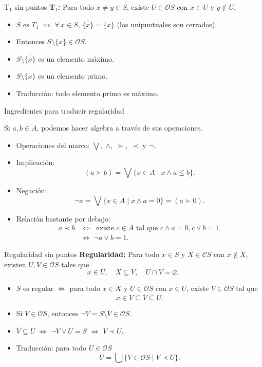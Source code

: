 \documentclass[compress,12pt]{beamer}
\begin{document}
\begin{frame}{T$_1$ sin puntos}
\textbf{T$_1$:} Para todo $x\neq y\in S$, existe $U\in \mathcal{O}S$ con $x\in U$ y $y\notin U$.

\vspace{0.5em}
\begin{itemize}
  \item<2-> $S$ es $T_1$ $\iff$ $\forall\,x\in S$, $\overline{\{x\}}=\{x\}$ (los unipuntuales son cerrados).
  \item<3-> Entonces $S\setminus\{x\}\in \mathcal{O}S$.
  \item<4-> $S\setminus\overline{\{x\}}$ es un elemento máximo.
  \item<5-> $S\setminus\{x\}$ es un elemento primo. 
  \item<6-> \alert{Traducción:} todo elemento primo es máximo.
\end{itemize}
\end{frame}

\begin{frame}{Ingredientes para traducir regularidad}

  Si $a,b\in A$, podemos hacer algebra a través de sus operaciones.
  \begin{itemize}
    \item<2-> Operaciones del marco: $\bigvee,\;\wedge,\;\succ,\;\prec$\; y \;$\neg$.
    \item<3-> Implicación:
      \[
        (a \succ b)=\bigvee\{x\in A\mid x\wedge a\leq b\}.
      \]
    \item<4-> Negación:
      \[
        \neg a=\bigvee\{x\in A\mid x\wedge a=0\}=(a \succ 0).
      \]
    \item<5-> Relación bastante por debajo: 
      \[
      \begin{split}
        a \prec b &\iff\;\mbox{ existe } c\in A \mbox{ tal que } c\wedge a=0, c\vee b=1.\\
        &\iff\; \neg a \vee b=1.
      \end{split}
      \]
  \end{itemize}

\end{frame}


\begin{frame}{Regularidad sin puntos}
\textbf{Regularidad:} Para todo $x\in S$ y $X\in \mathcal{C}S$ con $x\notin X$, existen $U,V\in \mathcal{O}S$ tales que 
\[
x\in U, \quad X\subseteq V, \quad U\cap V=\varnothing.
\]
\begin{itemize}
  \item<2-> $S$ es regular $\iff$ para todo $x\in X$ y $U\in \mathcal{O}S$ con  $x\in U$, existe $V\in\mathcal{O}S$ tal que
    \[
      x\in V\subseteq \overline{V}\subseteq U.
    \]
  \item<3-> Si $V\in \mathcal{O}S$, entonces $\neg V=S\setminus \overline{V}\in \mathcal{O}S$.
  \item<4-> $\overline{V}\subseteq U$ $\iff$ $\neg V\vee U=S$ $\iff$ $V\prec U$.
  \item<5-> \alert{Traducción:} para todo $U\in \mathcal{O}S$
  \[
    U=\bigcup\{V\in \mathcal{O}S \mid V\prec U\}.
  \]
\end{itemize}
\end{frame}
\end{document}
